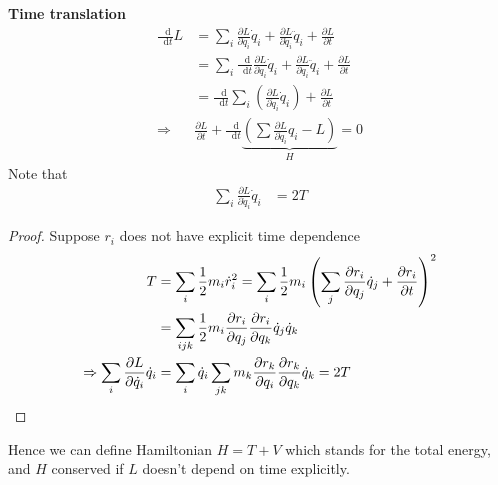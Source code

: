 \documentclass[twoside,11pt]{article}
\numberwithin{equation}{section} %
\renewcommand*\d{\mathop{}\!\mathrm{d}}
\theoremstyle{definition}
\theoremstyle{remark}
\begin{document}
\textbf{Time translation}
\begin{align}
    \frac{\d}{\d t}L &= 
    \sum_i\frac{\partial L}{\partial q_i}\dot{q}_i
    + \frac{\partial L}{\partial \dot{q}_i}\ddot{q}_i
    + \frac{\partial L}{\partial t}\\
    &= \sum_i\frac{\d}{\d t}\frac{\partial L}{\partial\dot{q}_i}\dot{q}_i
    + \frac{\partial L}{\partial \dot{q}_i}\ddot{q}_i
    + \frac{\partial L}{\partial t}\\
    &= \frac{\d}{\d t}\sum_i\left(\frac{\partial L}{\partial\dot{q}_i}\dot{q}_i\right)
    + \frac{\partial L}{\partial t}\\
    \Rightarrow &
    \frac{\partial L}{\partial t} + 
    \frac{\d}{\d t}\underbrace{\left(
    \sum\frac{\partial L}{\partial\dot{q}_i}q_i - L
    \right)}_{H}
    = 0
\end{align}
Note that
\begin{align}
    \sum_i\frac{\partial L}{\partial\dot{q}_i}\dot{q}_i &= 2T
\end{align}
\begin{proof}
Suppose $r_i$ does not have explicit time dependence
\begin{align*}
    T &= \sum_i \frac{1}{2}m_i\dot{r}_i^2
    = \sum_i \frac{1}{2}m_i\left(
        \sum_j\frac{\partial r_i}{\partial q_j}\dot{q}_j
        + \frac{\partial r_i}{\partial t}
    \right)^2\\
    &= \sum_{ijk}
    \frac{1}{2}m_i\frac{\partial r_i}{\partial q_j}
    \frac{\partial r_i}{\partial q_k}\dot{q}_j\dot{q}_k\\
    \Rightarrow
    \sum_i\frac{\partial L}{\partial\dot{q}_i}\dot{q}_i
    &= \sum_i \dot{q}_i \sum_{jk}
    m_k\frac{\partial r_k}{\partial q_i}\frac{\partial r_k}{\partial q_k}
    \dot{q}_k = 2T\qedhere
\end{align*}
\end{proof}
Hence we can define Hamiltonian $H = T+V$ which stands for the total energy,
and $H$ conserved if $L$ doesn't depend on time explicitly.
\end{document}

